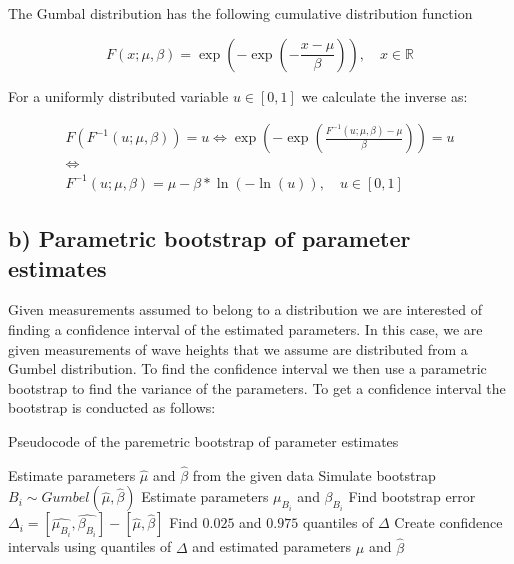 \documentclass[a4paper]{article}
\begin{document}
The Gumbal distribution has the following cumulative distribution function

\begin{equation}
    F(x; \mu, \beta) = \exp\left(-\exp\left(-\frac{x-\mu}{\beta}\right)\right), \quad x \in \mathbb{R}
    \label{eq:gumbel}
\end{equation}

For a uniformly distributed variable $u \in [0,1]$ we calculate the inverse as:

\begin{equation}
    \label{eq:inv_gumbel}
    \begin{gathered}
        F(F^{-1}(u;\mu, \beta)) = u \iff \exp(-\exp(\frac{F^{-1}(u;\mu,\beta)-\mu}{\beta})) = u \\
        \iff \\
        F^{-1}(u; \mu, \beta) = \mu - \beta*\ln(-\ln(u)), \quad u\in [0,1]
    \end{gathered}
\end{equation}


\subsection*{b) Parametric bootstrap of parameter estimates}

Given measurements assumed to belong to a distribution we are interested of finding a confidence interval of the estimated parameters. In this case, we are given measurements of wave heights that we assume are distributed from a Gumbel distribution. To find the confidence interval we then use a parametric bootstrap to find the variance of the parameters. To get a confidence interval the bootstrap is conducted as follows:

\begin{algorithm}
    \caption{Pseudocode of the paremetric bootstrap of parameter estimates}
    \begin{algorithmic}
        \State Estimate parameters $\hat{\mu}$ and $\hat{\beta}$ from the given data
        \State Simulate bootstrap $B_i \sim Gumbel(\hat{\mu}, \hat{\beta})$
        \State Estimate parameters $\mu_{B_i}$ and $\beta_{B_i}$
        \State Find bootstrap error $\Delta_i = [\hat{\mu_{B_i}}, \hat{\beta_{B_i}}] - [\hat{\mu}, \hat{\beta}]$
        \EndFor
        \State Find $0.025$ and $0.975$ quantiles of $\Delta$
        \State Create confidence intervals using quantiles of $\Delta$ and estimated parameters $\hat{\mu}$ and $\hat{\beta}$
    \end{algorithmic}
\end{algorithm}
\end{document}
